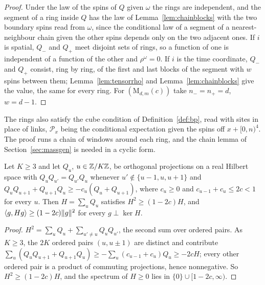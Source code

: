 \begin{proof}
Under the law of the spins of $Q$ given $\omega$ the rings are independent,
and the segment of a ring inside $Q$ has the law of
Lemma~\ref{lem:chainblocks} with the two boundary spins read from $\omega$,
since the conditional law of a segment of a nearest-neighbour chain given
the other spins depends only on the two adjacent ones. If $i$ is spatial,
$Q_-$ and $Q_+$ meet disjoint sets of rings, so a function of one is
independent of a function of the other and $\rho^\omega=0$. If $i$ is the
time coordinate, $Q_-$ and $Q_+$ consist, ring by ring, of the first and
last blocks of the segment with $w$ spins between them;
Lemma~\ref{lem:tensorrho} and Lemma~\ref{lem:chainblocks} give the value,
the same for every ring. For $(\mathrm M_{d,m}(c))$ take $n_-=n_+=d$,
$w=d-1$.
\end{proof}

The rings also satisfy the cube condition of Definition~\ref{def:bp}, read
with sites in place of links, $\mathcal P_x$ being the conditional
expectation given the spins off $x+[0,n)^4$. The proof runs a chain of
windows around each ring, and the chain lemma of Section~\ref{sec:massgen}
is needed in a cyclic form.

\begin{lemma}\label{lem:cyclicchain}
Let $K\ge3$ and let $Q_u$, $u\in\mathbb{Z}/K\mathbb{Z}$, be orthogonal projections on a real
Hilbert space with $Q_uQ_{u'}=Q_{u'}Q_u$ whenever $u'\notin\{u-1,u,u+1\}$ and
$Q_uQ_{u+1}+Q_{u+1}Q_u\ge-c_u(Q_u+Q_{u+1})$, where $c_u\ge0$ and
$c_{u-1}+c_u\le2c<1$ for every $u$. Then $H=\sum_uQ_u$ satisfies
$H^2\ge(1-2c)H$, and $\langle g,Hg\rangle\ge(1-2c)\|g\|^2$ for every $g\perp\ker H$.
\end{lemma}

\begin{proof}
$H^2=\sum_uQ_u+\sum_{u'\ne u}Q_uQ_{u'}$, the second sum over ordered pairs. As
$K\ge3$, the $2K$ ordered pairs $(u,u\pm1)$ are distinct and contribute
$\sum_u(Q_uQ_{u+1}+Q_{u+1}Q_u)\ge-\sum_u(c_{u-1}+c_u)Q_u\ge-2cH$; every other
ordered pair is a product of commuting projections, hence nonnegative. So
$H^2\ge(1-2c)H$, and the spectrum of $H\ge0$ lies in $\{0\}\cup[1-2c,\infty)$.
\end{proof}

